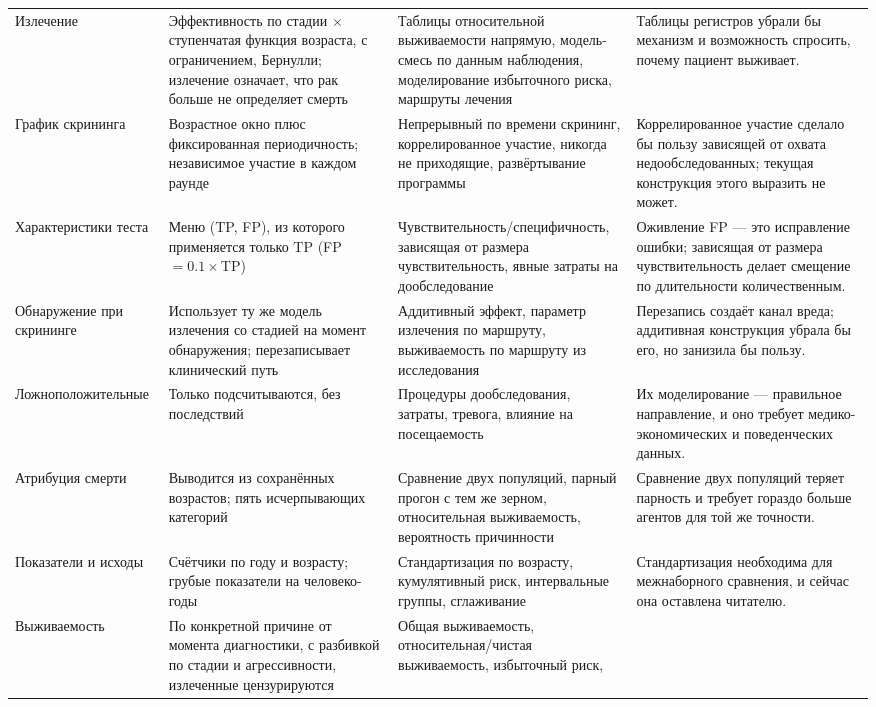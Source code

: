 \documentclass[12pt,a4paper]{article}
\begin{document}
{\begin{longtable}{@{}p{2.3cm}p{4.5cm}p{4.0cm}p{4.0cm}@{}}
Излечение & Эффективность по стадии $\times$ ступенчатая функция возраста, с ограничением, Бернулли; излечение
означает, что рак больше не определяет смерть & Таблицы относительной выживаемости напрямую, модель-смесь по
данным наблюдения, моделирование избыточного риска, маршруты лечения & Таблицы регистров убрали бы механизм и
возможность спросить, почему пациент выживает. \\
График скрининга & Возрастное окно плюс фиксированная периодичность; независимое участие в каждом раунде &
Непрерывный по времени скрининг, коррелированное участие, никогда не приходящие, развёртывание программы &
Коррелированное участие сделало бы пользу зависящей от охвата недообследованных; текущая конструкция этого
выразить не может. \\
Характеристики теста & Меню (TP, FP), из которого применяется только TP (FP $=0.1\times$TP) &
Чувствительность/специфичность, зависящая от размера чувствительность, явные затраты на дообследование &
Оживление FP --- это исправление ошибки; зависящая от размера чувствительность делает смещение по
длительности количественным. \\
Обнаружение при скрининге & Использует ту же модель излечения со стадией на момент обнаружения; перезаписывает
клинический путь & Аддитивный эффект, параметр излечения по маршруту, выживаемость по маршруту из
исследования & Перезапись создаёт канал вреда; аддитивная конструкция убрала бы его, но занизила бы пользу. \\
Ложноположительные & Только подсчитываются, без последствий & Процедуры дообследования, затраты, тревога,
влияние на посещаемость & Их моделирование --- правильное направление, и оно требует медико-экономических и
поведенческих данных. \\
Атрибуция смерти & Выводится из сохранённых возрастов; пять исчерпывающих категорий & Сравнение двух
популяций, парный прогон с тем же зерном, относительная выживаемость, вероятность причинности & Сравнение
двух популяций теряет парность и требует гораздо больше агентов для той же точности. \\
Показатели и исходы & Счётчики по году и возрасту; грубые показатели на человеко-годы & Стандартизация по
возрасту, кумулятивный риск, интервальные группы, сглаживание & Стандартизация необходима для межнаборного
сравнения, и сейчас она оставлена читателю. \\
Выживаемость & По конкретной причине от момента диагностики, с разбивкой по стадии и агрессивности,
излеченные цензурируются & Общая выживаемость, относительная/чистая выживаемость, избыточный риск,

\end{longtable}}
\end{document}
